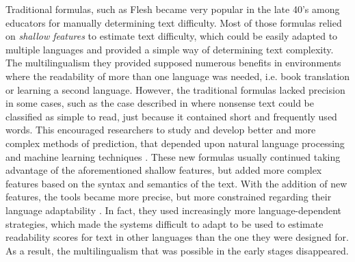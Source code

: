 \documentclass[12pt]{article}
\begin{document}
Traditional formulas, such as Flesh \cite{flesch1948new} became very popular in the late 40's among educators for manually determining text difficulty. Most of those formulas relied on \textit{shallow features} to estimate text difficulty, which could be easily adapted to multiple languages and provided a simple way of determining text complexity. The multilingualism they provided supposed numerous benefits in environments where the readability of more than one language was needed, i.e. book translation or learning a second language. However, the traditional formulas lacked precision in some cases, such as the case described in \cite{davison1982failure} where nonsense text could be classified as simple to read, just because it contained short and frequently used words. This encouraged researchers to study and develop better and more complex methods of prediction, that depended upon natural language processing and machine learning techniques \cite{franccois2012ai,aluisio2010readability}. These new formulas usually continued taking advantage of the aforementioned shallow  features, but added more complex features based on the syntax and semantics of the text. With the addition of new features, the tools became more precise, but more constrained regarding their language adaptability \cite{benjamin2012reconstructing,feng2010comparison}. In fact, they used increasingly more language-dependent strategies, which made the systems difficult to adapt to be used to estimate readability scores for text in other languages than the one they were designed for. As a result, the multilingualism that was possible in the early stages disappeared.  
\end{document}
